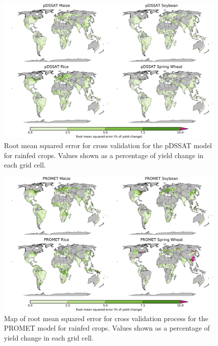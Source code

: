 \documentclass[12pt]{article}
\begin{document}
\begin{figure}[!htb]
  \centering
  \includegraphics[width=15.5cm]{pDSSAT_spatial_MSE_ton_ha.png}
  \caption{Root mean squared error for cross validation for the pDSSAT model for rainfed crops. Values shown as a percentage of yield change in each grid cell.}
\end{figure}

\begin{figure}[!htb]
  \centering
  \includegraphics[width=15.5cm]{PROMET_spatial_MSE_ton_ha.png}
  \caption{Map of root mean squared error for cross validation process for the PROMET model for rainfed crops. Values shown as a percentage of yield change in each grid cell.}
\end{figure}
\end{document}
